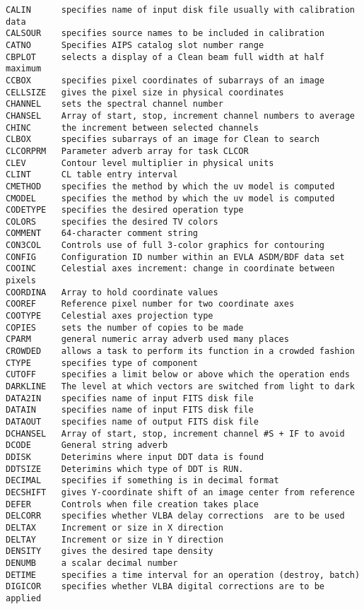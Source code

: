 \begin{verbatim}
CALIN      specifies name of input disk file usually with calibration data
CALSOUR    specifies source names to be included in calibration
CATNO      Specifies AIPS catalog slot number range
CBPLOT     selects a display of a Clean beam full width at half maximum
CCBOX      specifies pixel coordinates of subarrays of an image
CELLSIZE   gives the pixel size in physical coordinates
CHANNEL    sets the spectral channel number
CHANSEL    Array of start, stop, increment channel numbers to average
CHINC      the increment between selected channels
CLBOX      specifies subarrays of an image for Clean to search
CLCORPRM   Parameter adverb array for task CLCOR
CLEV       Contour level multiplier in physical units
CLINT      CL table entry interval
CMETHOD    specifies the method by which the uv model is computed
CMODEL     specifies the method by which the uv model is computed
CODETYPE   specifies the desired operation type
COLORS     specifies the desired TV colors
COMMENT    64-character comment string
CON3COL    Controls use of full 3-color graphics for contouring
CONFIG     Configuration ID number within an EVLA ASDM/BDF data set
COOINC     Celestial axes increment: change in coordinate between pixels
COORDINA   Array to hold coordinate values
COOREF     Reference pixel number for two coordinate axes
COOTYPE    Celestial axes projection type
COPIES     sets the number of copies to be made
CPARM      general numeric array adverb used many places
CROWDED    allows a task to perform its function in a crowded fashion
CTYPE      specifies type of component
CUTOFF     specifies a limit below or above which the operation ends
DARKLINE   The level at which vectors are switched from light to dark
DATA2IN    specifies name of input FITS disk file
DATAIN     specifies name of input FITS disk file
DATAOUT    specifies name of output FITS disk file
DCHANSEL   Array of start, stop, increment channel #S + IF to avoid
DCODE      General string adverb
DDISK      Deterimins where input DDT data is found
DDTSIZE    Deterimins which type of DDT is RUN.
DECIMAL    specifies if something is in decimal format
DECSHIFT   gives Y-coordinate shift of an image center from reference
DEFER      Controls when file creation takes place
DELCORR    specifies whether VLBA delay corrections  are to be used
DELTAX     Increment or size in X direction
DELTAY     Increment or size in Y direction
DENSITY    gives the desired tape density
DENUMB     a scalar decimal number
DETIME     specifies a time interval for an operation (destroy, batch)
DIGICOR    specifies whether VLBA digital corrections are to be applied

\end{verbatim}
